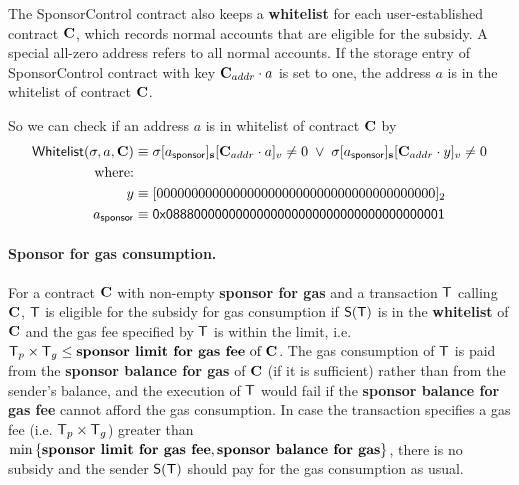 The SponsorControl contract also keeps a {\bf whitelist} for each user-established contract $\mathbf{C}$, which records normal accounts that are eligible for the subsidy. A special all-zero address refers to all normal accounts. If the storage entry of SponsorControl contract with key $\mathbf{C}_{addr}\cdot a$ is set to one, the address $a$ is in the whitelist of contract $\mathbf{C}$.

So we can check if an address $a$ is in whitelist of contract $\mathbf{C}$ by
\begin{align}
	\mathsf{Whitelist}(\mathbf{\sigma},a,\mathbf{C}) &\equiv \mathbf{\sigma}[a_{\sf sponsor}]_{\bf s}[\mathbf{C}_{addr}\cdot a]_v \neq 0 \;\vee\; \mathbf{\sigma}[a_{\sf sponsor}]_{\bf s}[\mathbf{C}_{addr}\cdot y]_v \neq 0 \notag \\
	\mbox{where:}&\notag \\
	y&\equiv [0000000000000000000000000000000000000000]_2 \notag \\ 
	a_{\sf sponsor} & \equiv {\sf 0x0888000000000000000000000000000000000001} \label{eq:whitelist}
\end{align}




\paragraph{Sponsor for gas consumption.}
For a contract $\mathbf{C}$ with non-empty {\bf sponsor for gas} and a transaction $\textsf{T}$ calling $\mathbf{C}$, 
$\textsf{T}$ is eligible for the subsidy for gas consumption 
if $\mathsf{S} (\textsf{T})$ is in the \textbf{whitelist} of $\mathbf{C}$
and the gas fee specified by $\textsf{T}$ is within the limit, i.e. $\textsf{T}_p\times\textsf{T}_g \le \text{\textbf{sponsor limit for gas fee} of $\mathbf{C}$}$.
The gas consumption of $\textsf{T}$ is paid from the \textbf{sponsor balance for gas} of $\mathbf{C}$ (if it is sufficient) rather than from the sender's balance,
and the execution of $\textsf{T}$ would fail if the \textbf{sponsor balance for gas fee} cannot afford the gas consumption.
In case the transaction specifies a gas fee (i.e. $\textsf{T}_p\times\textsf{T}_g$) greater than $\min{\left \{{\textbf{sponsor limit for gas fee}, \textbf{sponsor balance for gas}} \right \}}$, there is no subsidy and the sender $\mathsf{S}{\left({\textsf{T}} \right)}$ should pay for the gas consumption as usual.


